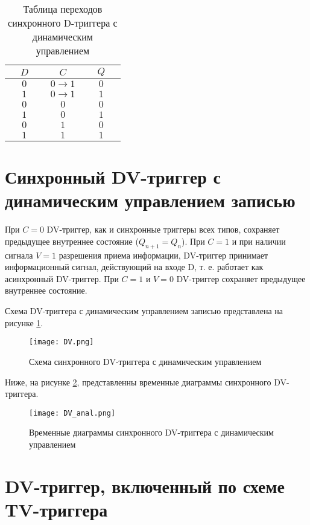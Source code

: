 \begin{table}
	\centering
	\caption{Таблица переходов синхронного D-триггера с динамическим управлением}
	\begin{tabular}{|c|c|c|}
		\hline
		$~~~~~D~~~~~$ & $~~~~~C~~~~~$ & $~~~~~Q~~~~~$ \\
		\hline
		$0$ & $0 \rightarrow 1$ & $0$ \\
		\hline
		$1$ & $0 \rightarrow 1$ & $1$ \\
		\hline
		$0$ & $0$ & $0$ \\
		\hline
		$1$ & $0$ & $1$ \\
		\hline
		$0$ & $1$ & $0$ \\
		\hline
		$1$ & $1$ & $1$ \\
		\hline
	\end{tabular}
	\label{d-dyn-table}
\end{table}

\pagebreak

\section{Синхронный DV-триггер с динамическим управлением записью}

При $C = 0$ DV-триггер, как и синхронные триггеры всех типов, сохраняет предыдущее внутреннее состояние ($Q_{n+1} = Q_n$). При $C = 1$ и при наличии сигнала $V = 1$ разрешения приема информации, DV-триггер принимает информационный сигнал, действующий на входе D, т. е. работает как асинхронный DV-триггер. При $C = 1$ и $V = 0$ DV-триггер сохраняет предыдущее внутреннее состояние.

Схема DV-триггера с динамическим управлением записью представлена на рисунке \ref{dv}.

\begin{figure}
	\centering
	\texttt{[image: DV.png]}
	\caption{Схема синхронного DV-триггера с динамическим управлением}
	\label{dv}
\end{figure}

Ниже, на рисунке \ref{dv-diag}, представленны временные диаграммы синхронного DV-триггера.

\begin{figure}
	\centering
	\texttt{[image: DV\_anal.png]}
	\caption{Временные диаграммы синхронного DV-триггера с динамическим управлением}
	\label{dv-diag}
\end{figure}

\pagebreak

\section{DV-триггер, включенный по схеме TV-триггера}

